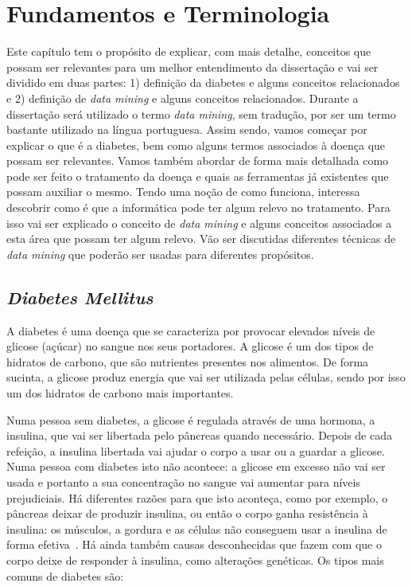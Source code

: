 \chapter{Fundamentos e Terminologia}\label{chap:concepts}

Este capítulo tem o propósito de explicar, com mais detalhe, conceitos que possam ser relevantes para um melhor entendimento da dissertação e vai ser dividido em duas partes: 1) definição da diabetes e alguns conceitos relacionados e 2) definição de \textit{data mining} e alguns conceitos relacionados. Durante a dissertação será utilizado o termo \textit{data mining}, sem tradução, por ser um termo bastante utilizado na língua portuguesa.
Assim sendo, vamos começar por explicar o que é a diabetes, bem como alguns termos associados à doença que possam ser relevantes. Vamos também abordar de forma mais detalhada como pode ser feito o tratamento da doença e quais as ferramentas já existentes que possam auxiliar o mesmo. 
Tendo uma noção de como funciona, interessa descobrir como é que a informática pode ter algum relevo no tratamento. Para isso vai ser explicado o conceito de \textit{data mining} e alguns conceitos associados a esta área que possam ter algum relevo. Vão ser discutidas diferentes técnicas de \textit{data mining} que poderão ser usadas para diferentes propósitos.

\section{\textit{Diabetes Mellitus}}

A diabetes é uma doença que se caracteriza por provocar elevados níveis de glicose (açúcar) no sangue nos seus portadores. A glicose é um dos tipos de hidratos de carbono, que são nutrientes presentes nos alimentos. De forma sucinta, a glicose produz energia que vai ser utilizada pelas células, sendo por isso um dos hidratos de carbono mais importantes. 

Numa pessoa sem diabetes, a glicose é regulada através de uma hormona, a insulina, que vai ser libertada pelo pâncreas quando necessário. Depois de cada refeição, a insulina libertada vai ajudar o corpo a usar ou a guardar a glicose. 
Numa pessoa com diabetes isto não acontece: a glicose em excesso não vai ser usada e portanto a sua concentração no sangue vai aumentar para níveis prejudiciais. Há diferentes razões para que isto aconteça, como por exemplo, o pâncreas deixar de produzir insulina, ou então o corpo ganha resistência à insulina: os músculos, a gordura e as células não conseguem usar a insulina de forma efetiva~\cite{spd}. Há ainda também causas desconhecidas que fazem com que o corpo deixe de responder à insulina, como alterações genéticas. Os tipos mais comuns de diabetes são:

